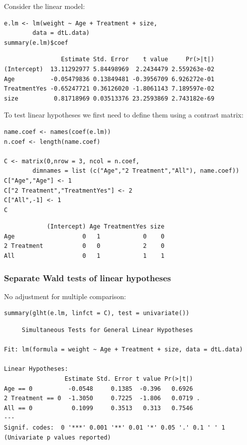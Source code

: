 \documentclass{article}
\begin{document}
Consider the linear model:
\lstset{language=r,label= ,caption= ,captionpos=b,numbers=none}
\begin{lstlisting}
e.lm <- lm(weight ~ Age + Treatment + size,
	    data = dtL.data)
summary(e.lm)$coef
\end{lstlisting}

\begin{verbatim}
                Estimate Std. Error    t value     Pr(>|t|)
(Intercept)  13.11292977 5.84498969  2.2434479 2.559263e-02
Age          -0.05479836 0.13849481 -0.3956709 6.926272e-01
TreatmentYes -0.65247721 0.36126020 -1.8061143 7.189597e-02
size          0.81718969 0.03513376 23.2593869 2.743182e-69
\end{verbatim}

To test linear hypotheses we first need to define them using a contrast matrix:
\lstset{language=r,label= ,caption= ,captionpos=b,numbers=none}
\begin{lstlisting}
name.coef <- names(coef(e.lm))
n.coef <- length(name.coef)

C <- matrix(0,nrow = 3, ncol = n.coef, 
	    dimnames = list (c("Age","2 Treatment","All"), name.coef))
C["Age","Age"] <- 1
C["2 Treatment","TreatmentYes"] <- 2
C["All",-1] <- 1
C
\end{lstlisting}

\begin{verbatim}
            (Intercept) Age TreatmentYes size
Age                   0   1            0    0
2 Treatment           0   0            2    0
All                   0   1            1    1
\end{verbatim}

\subsubsection{Separate Wald tests of linear hypotheses}
\label{sec:orgf16180d}

No adjustment for multiple comparison:
\lstset{language=r,label= ,caption= ,captionpos=b,numbers=none}
\begin{lstlisting}
summary(glht(e.lm, linfct = C), test = univariate())
\end{lstlisting}

\begin{verbatim}
	 Simultaneous Tests for General Linear Hypotheses

Fit: lm(formula = weight ~ Age + Treatment + size, data = dtL.data)

Linear Hypotheses:
                 Estimate Std. Error t value Pr(>|t|)  
Age == 0          -0.0548     0.1385  -0.396   0.6926  
2 Treatment == 0  -1.3050     0.7225  -1.806   0.0719 .
All == 0           0.1099     0.3513   0.313   0.7546  
---
Signif. codes:  0 '***' 0.001 '**' 0.01 '*' 0.05 '.' 0.1 ' ' 1
(Univariate p values reported)
\end{verbatim}
\end{document}
